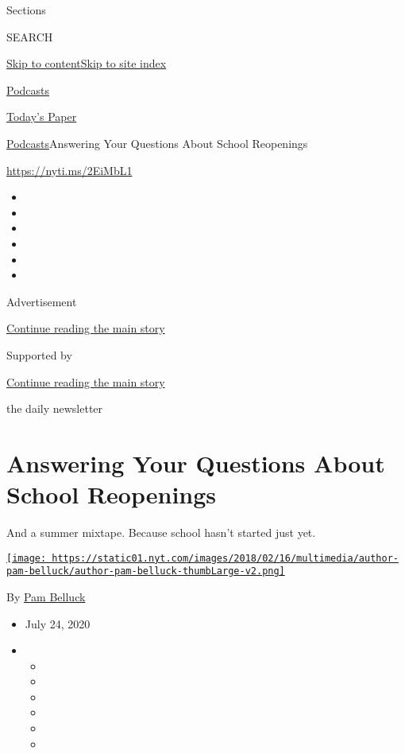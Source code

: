 Sections

SEARCH

\protect\hyperlink{site-content}{Skip to
content}\protect\hyperlink{site-index}{Skip to site index}

\href{https://www.nytimes.com/spotlight/podcasts}{Podcasts}

\href{https://myaccount.nytimes.com/auth/login?response_type=cookie\&client_id=vi}{}

\href{https://www.nytimes.com/section/todayspaper}{Today's Paper}

\href{/spotlight/podcasts}{Podcasts}\textbar{}Answering Your Questions
About School Reopenings

\url{https://nyti.ms/2EiMbL1}

\begin{itemize}
\item
\item
\item
\item
\item
\item
\end{itemize}

Advertisement

\protect\hyperlink{after-top}{Continue reading the main story}

Supported by

\protect\hyperlink{after-sponsor}{Continue reading the main story}

the daily newsletter

\hypertarget{answering-your-questions-about-school-reopenings}{%
\section{Answering Your Questions About School
Reopenings}\label{answering-your-questions-about-school-reopenings}}

And a summer mixtape. Because school hasn't started just yet.

\href{https://www.nytimes.com/by/pam-belluck}{\texttt{[image: https://static01.nyt.com/images/2018/02/16/multimedia/author-pam-belluck/author-pam-belluck-thumbLarge-v2.png]}}

By \href{https://www.nytimes.com/by/pam-belluck}{Pam Belluck}

\begin{itemize}
\item
  July 24, 2020
\item
  \begin{itemize}
  \item
  \item
  \item
  \item
  \item
  \item
  \end{itemize}
\end{itemize}

